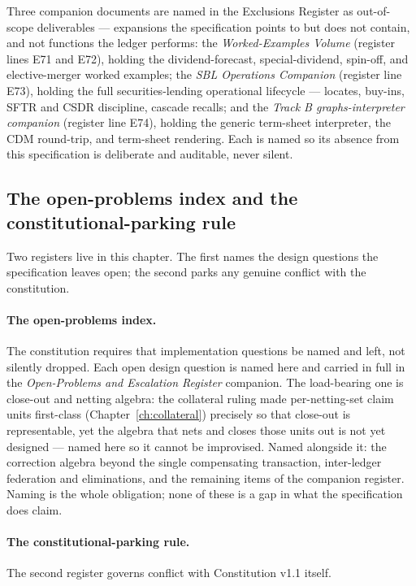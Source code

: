 Three companion documents are named in the Exclusions Register as out-of-scope
deliverables --- expansions the specification points to but does not contain, and not
functions the ledger performs: the \emph{Worked-Examples Volume} (register lines E71 and
E72), holding the dividend-forecast, special-dividend, spin-off, and elective-merger
worked examples; the \emph{SBL Operations Companion} (register line E73), holding the full
securities-lending operational lifecycle --- locates, buy-ins, SFTR and CSDR discipline,
cascade recalls; and the \emph{Track B graphs-interpreter companion} (register line E74),
holding the generic term-sheet interpreter, the CDM round-trip, and term-sheet rendering.
Each is named so its absence from this specification is deliberate and auditable, never
silent.

\subsection{The open-problems index and the constitutional-parking rule}

Two registers live in this chapter. The first names the design questions the specification
leaves open; the second parks any genuine conflict with the constitution.

\paragraph{The open-problems index.} The constitution requires that implementation
questions be named and left, not silently dropped. Each open design question is named here
and carried in full in the \emph{Open-Problems and Escalation Register} companion. The
load-bearing one is close-out and netting algebra: the collateral ruling made
per-netting-set claim units first-class (Chapter~\ref{ch:collateral}) precisely so that
close-out is representable, yet the algebra that nets and closes those units out is not yet
designed --- named here so it cannot be improvised. Named alongside it: the correction
algebra beyond the single compensating transaction, inter-ledger federation and
eliminations, and the remaining items of the companion register. Naming is the whole
obligation; none of these is a gap in what the specification does claim.

\paragraph{The constitutional-parking rule.} The second register governs conflict with
Constitution v1.1 itself.

